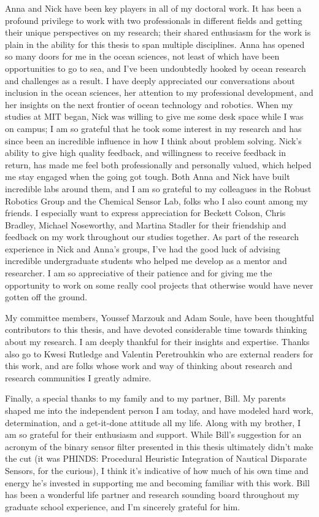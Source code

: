 Anna and Nick have been key players in all of my doctoral work. It has been a profound privilege to work with two professionals in different fields and getting their unique perspectives on my research; their shared enthusiasm for the work is plain in the ability for this thesis to span multiple disciplines. Anna has opened so many doors for me in the ocean sciences, not least of which have been opportunities to go to sea, and I've been undoubtedly hooked by ocean research and challenges as a result. I have deeply appreciated our conversations about inclusion in the ocean sciences, her attention to my professional development, and her insights on the next frontier of ocean technology and robotics. When my studies at MIT began, Nick was willing to give me some desk space while I was on campus; I am so grateful that he took some interest in my research and has since been an incredible influence in how I think about problem solving. Nick's ability to give high quality feedback, and willingness to receive feedback in return, has made me feel both professionally and personally valued, which helped me stay engaged when the going got tough. Both Anna and Nick have built incredible labs around them, and I am so grateful to my colleagues in the Robust Robotics Group and the Chemical Sensor Lab, folks who I also count among my friends. I especially want to express appreciation for Beckett Colson, Chris Bradley, Michael Noseworthy, and Martina Stadler for their friendship and feedback on my work throughout our studies together. As part of the research experience in Nick and Anna's groups, I've had the good luck of advising incredible undergraduate students who helped me develop as a mentor and researcher. I am so appreciative of their patience and for giving me the opportunity to work on some really cool projects that otherwise would have never gotten off the ground. 

My committee members, Youssef Marzouk and Adam Soule, have been thoughtful contributors to this thesis, and have devoted considerable time towards thinking about my research. I am deeply thankful for their insights and expertise. Thanks also go to Kwesi Rutledge and Valentin Peretrouhkin who are external readers for this work, and are folks whose work and way of thinking about research and research communities I greatly admire.

Finally, a special thanks to my family and to my partner, Bill. My parents shaped me into the independent person I am today, and have modeled hard work, determination, and a get-it-done attitude all my life. Along with my brother, I am so grateful for their enthusiasm and support. While Bill's suggestion for an acronym of the binary sensor filter presented in this thesis ultimately didn't make the cut (it was PHINDS: Procedural Heuristic Integration of Nautical Disparate Sensors, for the curious), I think it's indicative of how much of his own time and energy he's invested in supporting me and becoming familiar with this work. Bill has been a wonderful life partner and research sounding board throughout my graduate school experience, and I'm sincerely grateful for him.

